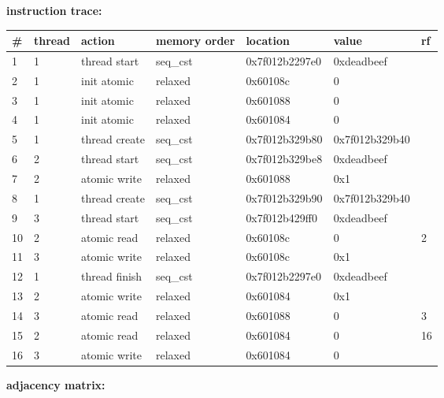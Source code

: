 \textbf{instruction trace:}\\
\begin{table}[!htb]
\small
\begin{tabular}{l l l l l l l}
\hline
\textbf{\#} & \textbf{thread} & \textbf{action} & \textbf{memory order} & \textbf{location} & \textbf{value} & \textbf{rf}\\
\hline\hline
1 & 1 & thread start & seq\_cst & 0x7f012b2297e0 & 0xdeadbeef\\
\hline
2 & 1 & init atomic & relaxed & 0x60108c & 0\\
\hline
3 & 1 & init atomic & relaxed & 0x601088 & 0\\
\hline
4 & 1 & init atomic & relaxed & 0x601084 & 0\\
\hline
5 & 1 & thread create & seq\_cst & 0x7f012b329b80 & 0x7f012b329b40\\
\hline
6 & 2 & thread start & seq\_cst & 0x7f012b329be8 & 0xdeadbeef\\
\hline
7 & 2 & atomic write & relaxed & 0x601088 & 0x1\\
\hline
8 & 1 & thread create & seq\_cst & 0x7f012b329b90 & 0x7f012b329b40\\
\hline
9 & 3 & thread start & seq\_cst & 0x7f012b429ff0 & 0xdeadbeef\\
\hline
10 & 2 & atomic read & relaxed & 0x60108c & 0 & 2\\
\hline
11 & 3 & atomic write & relaxed & 0x60108c & 0x1\\
\hline
12 & 1 & thread finish & seq\_cst & 0x7f012b2297e0 & 0xdeadbeef\\
\hline
13 & 2 & atomic write & relaxed & 0x601084 & 0x1\\
\hline
14 & 3 & atomic read & relaxed & 0x601088 & 0 & 3\\
\hline
15 & 2 & atomic read & relaxed & 0x601084 & 0 & 16\\
\hline
16 & 3 & atomic write & relaxed & 0x601084 & 0\\
\hline

\end{tabular}
\end{table}

\par
\textbf{adjacency matrix:}\\

